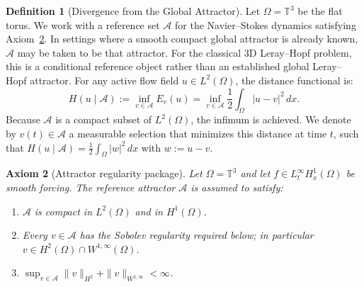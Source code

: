 \documentclass[12pt,a4paper]{article}
\theoremstyle{definition}
\newtheorem{definition}{Definition}[section]
\theoremstyle{plain}
\newtheorem{axiom}[definition]{Axiom}
\theoremstyle{remark}
\begin{document}
\begin{definition}[Divergence from the Global Attractor]
Let $\Omega = \mathbb{T}^3$ be the flat torus. We work with a reference set $\mathcal{A}$ for the Navier--Stokes dynamics satisfying Axiom~\ref{prop:attractor-regularity}. In settings where a smooth compact global attractor is already known, $\mathcal{A}$ may be taken to be that attractor. For the classical 3D Leray--Hopf problem, this is a conditional reference object rather than an established global Leray--Hopf attractor. For any active flow field $u \in L^2(\Omega)$, the distance functional is:
\begin{equation}
    H(u \mid \mathcal{A}) := \inf_{v \in \mathcal{A}} E_{v}(u) = \inf_{v \in \mathcal{A}} \frac{1}{2} \int_\Omega |u - v|^2 \, dx.
\end{equation}
Because $\mathcal{A}$ is a compact subset of $L^2(\Omega)$, the infimum is achieved. We denote by $v(t) \in \mathcal{A}$ a measurable selection that minimizes this distance at time $t$, such that $H(u \mid \mathcal{A}) = \frac{1}{2} \int_\Omega |w|^2 \, dx$ with $w := u - v$.
\end{definition}

\begin{axiom}[Attractor regularity package]
\label{prop:attractor-regularity}
Let $\Omega = \mathbb{T}^3$ and let $f \in L^\infty_t H^1_x(\Omega)$ be smooth
forcing.  The reference attractor $\mathcal{A}$ is assumed to satisfy:
\begin{enumerate}
    \item[\emph{(i)}]   $\mathcal{A}$ is compact in $L^2(\Omega)$ and in $H^1(\Omega)$.
    \item[\emph{(ii)}]  Every $v \in \mathcal{A}$ has the Sobolev regularity required below; in particular $v \in H^2(\Omega) \cap W^{1,\infty}(\Omega)$.
    \item[\emph{(iii)}] $\sup_{v \in \mathcal{A}} \|v\|_{H^2} + \|v\|_{W^{1,\infty}} < \infty$.
\end{enumerate}
\end{axiom}
\end{document}
